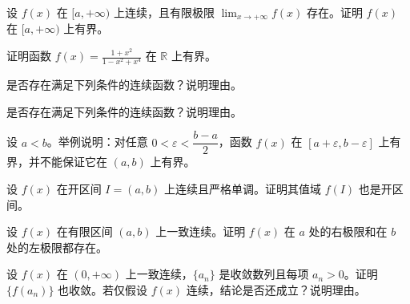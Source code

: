 \newpage
\noindent\begin{minipage}{\textwidth}
设 $f(x)$ 在 $[a,+\infty)$ 上连续，且有限极限 $\displaystyle\lim_{x\to+\infty}f(x)$ 存在。证明 $f(x)$ 在 $[a,+\infty)$ 上有界。
\end{minipage}\par\vfill
\noindent\begin{minipage}{\textwidth}
证明函数 $\displaystyle f(x)=\frac{1+x^2}{1-x^2+x^4}$ 在 $\mathbb R$ 上有界。
\end{minipage}\par\vfill
\noindent\begin{minipage}{\textwidth}
是否存在满足下列条件的连续函数？说明理由。
\end{minipage}\par\vfill
\noindent\begin{minipage}{\textwidth}
是否存在满足下列条件的连续函数？说明理由。
\end{minipage}\par\vfill
\newpage
\noindent\begin{minipage}{\textwidth}
设 $a<b$。举例说明：对任意 $0<\varepsilon<\dfrac{b-a}{2}$，函数 $f(x)$ 在 $[a+\varepsilon,b-\varepsilon]$ 上有界，并不能保证它在 $(a,b)$ 上有界。
\end{minipage}\par\vfill
\noindent\begin{minipage}{\textwidth}
设 $f(x)$ 在开区间 $I=(a,b)$ 上连续且严格单调。证明其值域 $f(I)$ 也是开区间。
\end{minipage}\par\vfill
\noindent\begin{minipage}{\textwidth}
设 $f(x)$ 在有限区间 $(a,b)$ 上一致连续。证明 $f(x)$ 在 $a$ 处的右极限和在 $b$ 处的左极限都存在。
\end{minipage}\par\vfill
\noindent\begin{minipage}{\textwidth}
设 $f(x)$ 在 $(0,+\infty)$ 上一致连续，$\{a_n\}$ 是收敛数列且每项 $a_n>0$。证明 $\{f(a_n)\}$ 也收敛。若仅假设 $f(x)$ 连续，结论是否还成立？说明理由。
\end{minipage}\par\vfill
